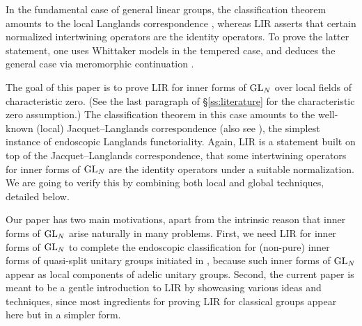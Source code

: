 \documentclass[11pt,reqno]{amsart}
\theoremstyle{plain}
\theoremstyle{definition}
\newcommand{\GL}{\tu{GL}}
\newcommand{\tu}{\textup}
\numberwithin{equation}{subsection}
\begin{document}
In the fundamental case of general linear groups, the classification theorem amounts to the local Langlands correspondence \cite{Hen00,HT01,LRS}, whereas LIR asserts that certain normalized intertwining operators are the identity operators. To prove the latter statement, one uses Whittaker models in the tempered case, and deduces the general case via meromorphic continuation \cite{Arthur,AGIKMS}.

The goal of this paper is to prove LIR for inner forms of $\GL_N$ over local fields of characteristic zero. (See the last paragraph of \S\ref{ss:literature} for the characteristic zero assumption.)
The classification theorem in this case amounts to the well-known (local) Jacquet--Langlands correspondence \cite{Rog83,DKV84} (also see \cite{BadRen}), the simplest instance of endoscopic Langlands functoriality. Again, LIR is a statement built on top of the Jacquet--Langlands correspondence, that some intertwining operators for inner forms of $\GL_N$ are the identity operators under a suitable normalization. We are going to verify this by combining both local and global techniques, detailed below. 

Our paper has two main motivations, apart from the intrinsic reason that inner forms of $\GL_N$ arise naturally in many problems. First, we need LIR for inner forms of $\GL_N$ to complete the endoscopic classification for (non-pure) inner forms of quasi-split unitary groups initiated in \cite{KMSW}, because such inner forms of $\GL_N$ appear as local components of adelic unitary groups. Second, the current paper is meant to be a gentle introduction to LIR by showcasing various ideas and techniques, since most ingredients for proving LIR for classical groups appear here but in a simpler form.
\end{document}
